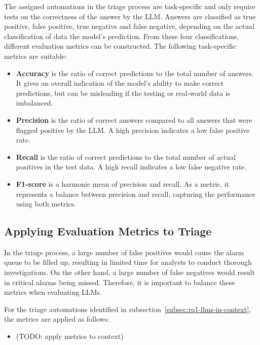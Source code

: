The assigned automations in the triage process are task-specific and only require tests on the correctness of the answer
by the LLM\@.
Answers are classified as true positive, false positive, true negative and false negative, depending on the actual
classification of data the model's prediction.
From these four classifications, different evaluation metrics can be constructed.
The following task-specific metrics are suitable:
\begin{itemize}
    \item \textbf{Accuracy} is the ratio of correct predictions to the total number of answers.
    It gives an overall indication of the model's ability to make correct predictions, but can be misleading if the
    testing or real-world data is imbalanced.
    \item \textbf{Precision} is the ratio of correct answers compared to all answers that were flagged positive by the
    LLM\@.
    A high precision indicates a low false positive rate.
    \item \textbf{Recall} is the ratio of correct predictions to the total number of actual positives in the test data.
    A high recall indicates a low false negative rate.
    \item \textbf{F1-score} is a harmonic mean of precision and recall.
    As a metric, it represents a balance between precision and recall, capturing the performance using both metrics.
\end{itemize}

\subsection{Applying Evaluation Metrics to Triage}
\label{subsec:rq2-evaluating-triage}

In the triage process, a large number of false positives would cause the alarm queue to be filled up, resulting in
limited time for analysts to conduct thorough investigations.
On the other hand, a large number of false negatives would result in critical alarms being missed.
Therefore, it is important to balance these metrics when evaluating LLMs.

For the triage automations identified in subsection\ \ref{subsec:rq1-llms-in-context}, the metrics are applied as
follows:
\begin{itemize}
    \item (TODO: apply metrics to context) %
\end{itemize}
